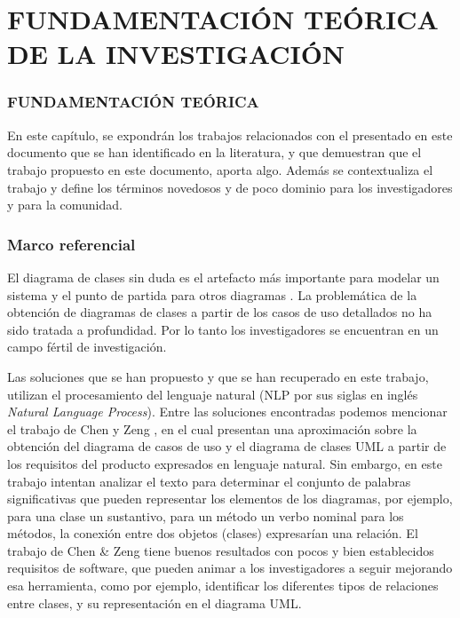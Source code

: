 \setcounter{chapter}{2}
\setcounter{section}{0}
\part{FUNDAMENTACIÓN TEÓRICA DE LA INVESTIGACIÓN}

\section*{FUNDAMENTACIÓN TEÓRICA}
En este capítulo, se expondrán los trabajos relacionados con el presentado en este documento que se han identificado en la literatura, y que demuestran que el trabajo propuesto en este documento, aporta algo. Además se contextualiza el trabajo y define los términos novedosos y de poco dominio para los investigadores y para la comunidad.

\section{Marco referencial}

El diagrama de clases sin duda es el artefacto más importante para modelar un sistema y el punto de partida para otros diagramas \cite{Tan2010}. La problemática de la obtención de diagramas de clases a partir de los casos de uso detallados no ha sido tratada a profundidad. Por lo tanto los investigadores se encuentran en un campo fértil de investigación.

Las soluciones que se han propuesto y que se han recuperado en este trabajo, utilizan el procesamiento del lenguaje natural (NLP por sus siglas en inglés \textit{Natural Language Process}). Entre las soluciones encontradas podemos mencionar el trabajo de Chen y Zeng \cite{Chen2010}, en el cual presentan una aproximación sobre la obtención del diagrama de casos de uso y el diagrama de clases UML a partir de los requisitos del producto expresados en lenguaje natural. Sin embargo, en este trabajo intentan analizar el texto para determinar el conjunto de palabras significativas que pueden representar los elementos de los diagramas, por ejemplo, para una clase un sustantivo, para un método un verbo nominal para los métodos, la conexión entre dos objetos (clases) expresarían una relación. El trabajo de Chen \& Zeng \cite{Chen2010} tiene buenos resultados con pocos y bien establecidos requisitos de software, que pueden animar a los investigadores a seguir mejorando esa herramienta, como por ejemplo, identificar los diferentes tipos de relaciones entre clases, y su representación en el diagrama UML.

